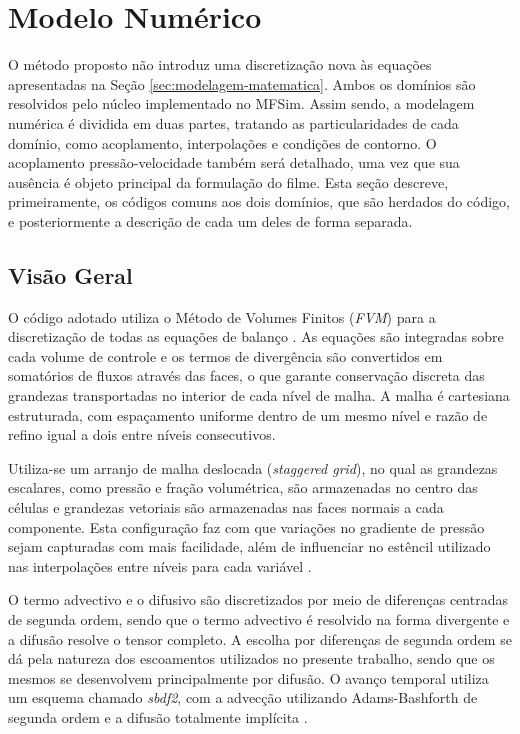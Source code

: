 \section{Modelo Numérico}
\label{sec:modelo-numerico}
O método proposto não introduz uma discretização nova às equações apresentadas na Seção \ref{sec:modelagem-matematica}. Ambos os domínios são resolvidos pelo núcleo implementado no MFSim. Assim sendo, a modelagem numérica é dividida em duas partes, tratando as particularidades de cada domínio, como acoplamento, interpolações e condições de contorno. O acoplamento pressão-velocidade também será detalhado, uma vez que sua ausência é objeto principal da formulação do filme. Esta seção descreve, primeiramente, os códigos comuns aos dois domínios, que são herdados do código, e posteriormente a descrição de cada um deles de forma separada.

\subsection{Visão Geral}
\label{sec:visao-geral-2}
O código adotado utiliza o Método de Volumes Finitos (\textit{FVM}) para a discretização de todas as equações de balanço \cite{versteeg2007}. As equações são integradas sobre cada volume de controle e os termos de divergência são convertidos em somatórios de fluxos através das faces, o que garante conservação discreta das grandezas transportadas no interior de cada nível de malha. A malha é cartesiana estruturada, com espaçamento uniforme dentro de um mesmo nível e razão de refino igual a dois entre níveis consecutivos.

Utiliza-se um arranjo de malha deslocada (\textit{staggered grid}), no qual as grandezas escalares, como pressão e fração volumétrica, são armazenadas no centro das células e grandezas vetoriais são armazenadas nas faces normais a cada componente. Esta configuração faz com que variações no gradiente de pressão sejam capturadas com mais facilidade, além de influenciar no estêncil utilizado nas interpolações entre níveis para cada variável \cite{versteeg2007,Villar2007}.

O termo advectivo e o difusivo são discretizados por meio de diferenças centradas de segunda ordem, sendo que o termo advectivo é resolvido na forma divergente e a difusão resolve o tensor completo. A escolha por diferenças de segunda ordem se dá pela natureza dos escoamentos utilizados no presente trabalho, sendo que os mesmos se desenvolvem principalmente por difusão. O avanço temporal utiliza um esquema chamado \textit{sbdf2}, com a advecção utilizando Adams-Bashforth de segunda ordem e a difusão totalmente implícita \cite{Martini2024}.

